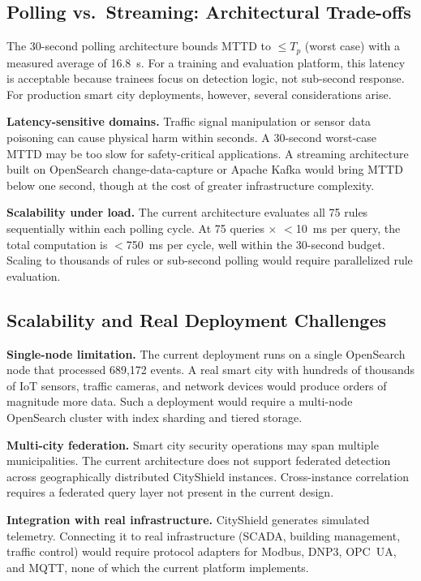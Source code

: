 \documentclass[conference,10pt]{IEEEtran}
\begin{document}
\subsection{Polling vs.\ Streaming: Architectural Trade-offs}

The 30-second polling architecture bounds MTTD to $\leq T_p$ (worst case) with a measured average of 16.8~s. For a training and evaluation platform, this latency is acceptable because trainees focus on detection logic, not sub-second response. For production smart city deployments, however, several considerations arise.

\textbf{Latency-sensitive domains.} Traffic signal manipulation or sensor data poisoning can cause physical harm within seconds. A 30-second worst-case MTTD may be too slow for safety-critical applications. A streaming architecture built on OpenSearch change-data-capture or Apache Kafka would bring MTTD below one second, though at the cost of greater infrastructure complexity.

\textbf{Scalability under load.} The current architecture evaluates all 75 rules sequentially within each polling cycle. At 75 queries $\times$ $<$10~ms per query, the total computation is $<$750~ms per cycle, well within the 30-second budget. Scaling to thousands of rules or sub-second polling would require parallelized rule evaluation.

\subsection{Scalability and Real Deployment Challenges}

\textbf{Single-node limitation.} The current deployment runs on a single OpenSearch node that processed 689,172 events. A real smart city with hundreds of thousands of IoT sensors, traffic cameras, and network devices would produce orders of magnitude more data. Such a deployment would require a multi-node OpenSearch cluster with index sharding and tiered storage.

\textbf{Multi-city federation.} Smart city security operations may span multiple municipalities. The current architecture does not support federated detection across geographically distributed CityShield instances. Cross-instance correlation requires a federated query layer not present in the current design.

\textbf{Integration with real infrastructure.} CityShield generates simulated telemetry. Connecting it to real infrastructure (SCADA, building management, traffic control) would require protocol adapters for Modbus, DNP3, OPC~UA, and MQTT, none of which the current platform implements.
\end{document}
